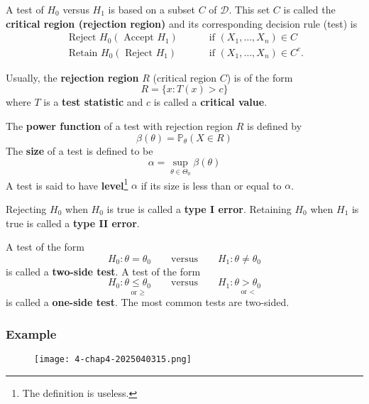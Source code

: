 \begin{definition}
A test of $H_0$ versus $H_1$ is based on a subset $C$ of $\mathcal{D}$. This set $C$ is called the \textbf{critical region (rejection region)} and its corresponding decision rule (test) is
\[
\begin{aligned} \text { Reject } H_0\left(\text { Accept } H_1\right) &\qquad  \text { if }\left(X_1, \ldots, X_n\right) \in C \\ \text { Retain } H_0\left(\text { Reject } H_1\right) & \qquad \text { if }\left(X_1, \ldots, X_n\right) \in C^c .\end{aligned}
\]
\end{definition}
Usually, the \textbf{rejection region} $R$ (critical region $C$) is of the form
\[
R=\{ x:T(x)>c \}
\]
where $T$ is a \textbf{test statistic} and $c$ is called a \textbf{critical value}.

\begin{definition}
The \textbf{power function} of a test with rejection region $R$ is defined by
\[
\beta(\theta)=\mathbb{P}_{\theta}(X\in R)
\]
The \textbf{size} of a test is defined to be
\[
\alpha=\sup_{\theta\in\Theta_0}\beta(\theta)
\]
A test is said to have \textbf{level}\footnote{The definition is useless.} $\alpha$ if its size is less than or equal to $\alpha$.
\end{definition}
\begin{definition}
Rejecting $H_0$ when $H_0$ is true is called a \textbf{type I error}. Retaining $H_0$ when $H_1$ is true is called a \textbf{type II error}.
\end{definition}
\begin{definition}
A test of the form
\[
H_0:\theta=\theta_0\qquad \text{versus}\qquad H_1:\theta\neq \theta_0
\]
is called a \textbf{two-side test}. A test of the form
\[
H_0:\underset{ \text{or }\geq  }{ \theta\leq \theta_0 }\qquad \text{versus}\qquad H_1:\underset{ \text{or }< }{ \theta>\theta_0 }
\]
is called a \textbf{one-side test}. The most common tests are two-sided.
\end{definition}
\subsubsection{Example}

\begin{figure}[H]
\centering
\texttt{[image: 4-chap4-2025040315.png]}
\label{}
\end{figure}

